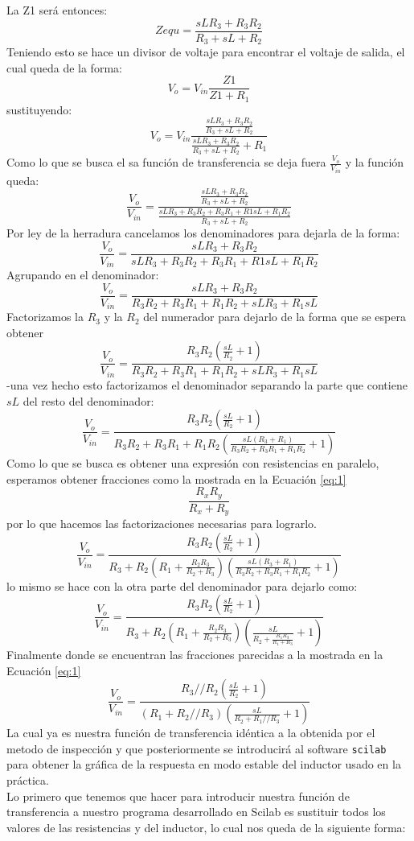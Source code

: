 \documentclass[letterpaper,10pt]{article}
\begin{document}
La Z1 será entonces:
\[Zequ=\frac{sLR_{3}+R_3R_2}{R_3+sL+R_2}\]
Teniendo esto se hace un divisor de voltaje para encontrar el voltaje de salida, el cual queda de la forma:
\[V_o=V_{in}\frac{Z1}{Z1+R_1}\]
sustituyendo:
\[V_o=V_{in}\frac{\frac{sLR_{3}+R_3R_2}{R_3+sL+R_2}}{\frac{sLR_{3}+R_3R_2}{R_3+sL+R_2}+R_1}\]
Como lo que se busca el sa función de transferencia se deja fuera $\frac{V_o}{V_{in}}$ y la función queda:
\[\frac{V_o}{V_{in}}=\frac{\frac{sLR_{3}+R_3R_2}{R_3+sL+R_2}}{\frac{sLR_{3}+R_3R_2+R_3R_1+R1sL+R_1R_2}{R_3+sL+R_2}}\]
Por ley de la herradura cancelamos los denominadores para dejarla de la forma:
\[\frac{V_o}{V_{in}}=\frac{sLR_{3}+R_3R_2}{sLR_{3}+R_3R_2+R_3R_1+R1sL+R_1R_2}\]
Agrupando en el denominador:
\[\frac{V_o}{V_{in}}=\frac{sLR_{3}+R_3R_2}{R_3R_2+R_3R_1+R_1R_2+sLR_3+R_1sL}\]
Factorizamos la $R_3$ y la $R_2$ del numerador para dejarlo de la forma que se espera obtener
\[\frac{V_o}{V_{in}}=\frac{R_{3}R_2(\frac{sL}{R_2}+1)}{R_3R_2+R_3R_1+R_1R_2+sLR_3+R_1sL}\]
-una vez hecho esto factorizamos el denominador separando la parte que contiene $sL$ del resto del denominador:
\[\frac{V_o}{V_{in}}=\frac{R_{3}R_2(\frac{sL}{R_2}+1)}{R_3R_2+R_3R_1+R_1R_2(\frac{sL(R_3+R_1)}{R_3R_2+R_3R_1+R_1R_2}+1)}\]
Como lo que se busca es obtener una expresión con resistencias en paralelo, esperamos obtener fracciones como la mostrada en la Ecuación \ref{eq:1}
\begin{equation}
\frac{R_xR_y}{R_x+R_y}
\label{eq:1}
\end{equation}
por lo que hacemos las factorizaciones necesarias para lograrlo.
\[\frac{V_o}{V_{in}}=\frac{R_{3}R_2(\frac{sL}{R_2}+1)}{R_3+R_2(R_1+\frac{R_2R_3}{R_2+R_3})(\frac{sL(R_3+R_1)}{R_3R_2+R_3R_1+R_1R_2}+1)}\]
lo mismo se hace con la otra parte del denominador para dejarlo como:
\[\frac{V_o}{V_{in}}=\frac{R_{3}R_2(\frac{sL}{R_2}+1)}{R_3+R_2(R_1+\frac{R_2R_3}{R_2+R_3})(\frac{sL}{R_2+\frac{R_1R_3}{R_1+R_3}}+1)}\]
Finalmente donde se encuentran las fracciones parecidas a la mostrada en la Ecuación  \ref{eq:1}
\[\frac{V_o}{V_{in}}=\frac{R_{3}//R_2(\frac{sL}{R_2}+1)}{(R_1+R_2//R_3)(\frac{sL}{R_2+R_1//R_3}+1)}\]
La cual ya es nuestra función de transferencia idéntica a la obtenida por el metodo de inspección y que posteriormente se introducirá al software \texttt{scilab} para obtener la gráfica de la respuesta en modo estable del inductor usado en la práctica.\\

Lo primero que tenemos que hacer para introducir nuestra función de transferencia a nuestro programa desarrollado en Scilab es sustituir todos los valores de las resistencias y del inductor, lo cual nos queda de la siguiente forma:\\
\end{document}
